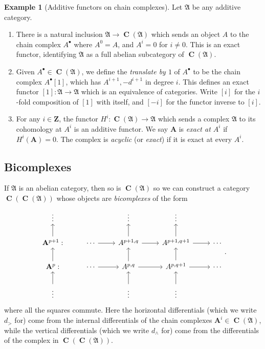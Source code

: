 \documentclass[a4paper]{article}
\theoremstyle{definition}
\newtheorem{example}[defn]{Example}
\theoremstyle{remark}
\DeclareMathOperator{\Ch}{\mathbf{C}}
\begin{document}
\begin{example}[Additive functors on chain complexes] Let \(\mathfrak{A}\)
    be any additive category.
    \begin{enumerate} 
        \item There is a natural inclusion \(\mathfrak{A}\rightarrow
            \Ch(\mathfrak{A})\) which sends an object \(A\) to the chain complex
            \(A^\bullet\) where \(A^0=A\), and \(A^i=0\) for \(i\neq 0\).
            This is an exact functor, identifying \(\mathfrak{A}\) as a
            full abelian subcategory of \(\Ch(\mathfrak{A})\).  
        \item Given \(A^\bullet\in \Ch(\mathfrak{A})\), we define the
            \textit{translate by \(1\)} of \(A^\bullet\) to be the chain complex
            \(A^\bullet[1]\), which has \(A^{i+1},-d^{i+1}\) in degree \(i\).
            This defines an exact functor \([1]:\mathfrak{A}\rightarrow
            \mathfrak{A}\) which is an equivalence of categories. Write \([i]\)
            for the \(i\)-fold composition of \([1]\) with itself, and \([-i]\)
            for the functor inverse to \([i]\).
        \item For any \(i\in \mathbf{Z}\), the functor \(H^i:
            \Ch(\mathfrak{A})\rightarrow \mathfrak{A}\) which sends a complex
            \(\mathfrak{A}\) to its cohomology at \(A^i\) is an additive
            functor. We say \(\mathbf{A}\) is \textit{exact at \(A^i\)} if
            \(H^i(\mathbf{A})=0\). The complex is \textit{acyclic} (or
            \textit{exact}) if it is exact at every \(A^i\).
    \end{enumerate}
\end{example}

\subsection{Bicomplexes}

If \(\mathfrak{A}\) is an abelian category, then so is \(\Ch(\mathfrak{A})\) so
we can construct a category \(\Ch(\Ch(\mathfrak{A}))\) whose objects are
\textit{bicomplexes} of the form
\begin{equation}\label{bicomplex}\begin{tikzcd}
    \vdots       &        & \vdots & \vdots &   \\
    \mathbf{A}^{p+1}:\arrow[u] & \cdots\arrow[r] & A^{p+1, q}\arrow[u] \arrow[r] & A^{p+1, q+1} \arrow[r] \arrow[u] & \cdots \\
    \mathbf{A}^p:\arrow[u]     & \cdots\arrow[r] & A^{p, q}\arrow[u]\arrow[r]
                               & A^{p, q+1}\arrow[u] \arrow[r]   & \cdots \\
    \vdots\arrow[u]            &        & \vdots\arrow[u] & \vdots\arrow[u] &   
\end{tikzcd}.\end{equation}
where all the squares commute. Here the horizontal differentials (which we write
\(d_{>}\) for) come from the internal differentials of the chain complexes
\(\mathbf{A}^i\in \Ch(\mathfrak{A})\), while the vertical differentials (which
we write \(d_\wedge\) for) come from the differentials of the complex in
\(\Ch(\Ch(\mathfrak{A}))\). 
\end{document}
